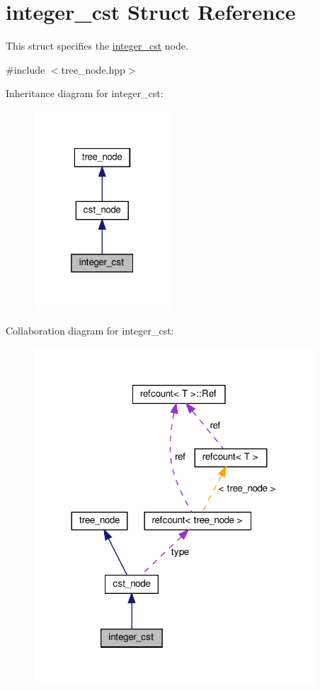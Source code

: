 \hypertarget{structinteger__cst}{}\section{integer\+\_\+cst Struct Reference}
\label{structinteger__cst}


This struct specifies the \hyperlink{structinteger__cst}{integer\+\_\+cst} node.  




{\ttfamily \#include $<$tree\+\_\+node.\+hpp$>$}



Inheritance diagram for integer\+\_\+cst\+:
\nopagebreak
\begin{figure}[H]
\begin{center}
\leavevmode
\includegraphics[width=145pt]{d3/d0e/structinteger__cst__inherit__graph}
\end{center}
\end{figure}


Collaboration diagram for integer\+\_\+cst\+:
\nopagebreak
\begin{figure}[H]
\begin{center}
\leavevmode
\includegraphics[width=297pt]{dd/dde/structinteger__cst__coll__graph}
\end{center}
\end{figure}
